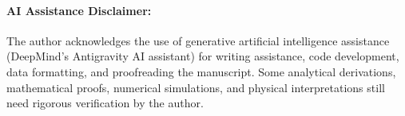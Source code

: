 \paragraph{AI Assistance Disclaimer:}
The author acknowledges the use of generative artificial intelligence assistance (DeepMind's Antigravity AI assistant) for writing assistance, code development, data formatting, and proofreading the manuscript. Some analytical derivations, mathematical proofs, numerical simulations, and physical interpretations still need rigorous verification by the author.
